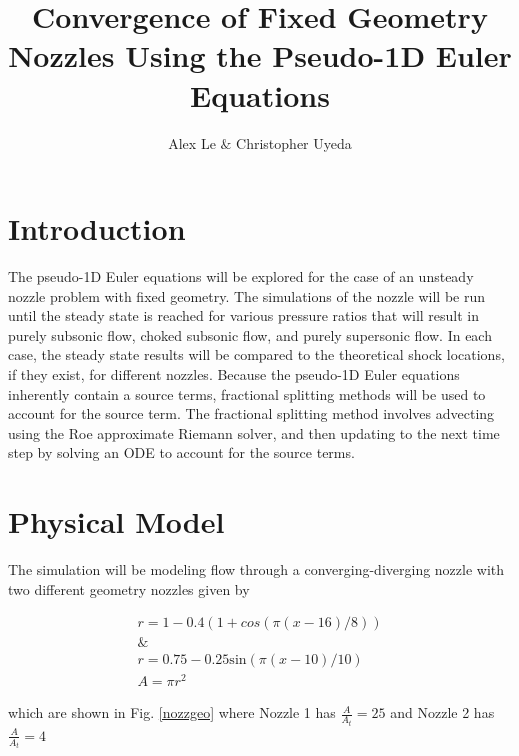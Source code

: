 \documentclass{article}%
\title{Convergence of Fixed Geometry Nozzles Using the Pseudo-1D Euler Equations}
\author{Alex Le $\&$ Christopher Uyeda}
\numberwithin{equation}{section}
\begin{document}
\maketitle

\section{Introduction}
The pseudo-1D Euler equations will be explored for the case of an unsteady nozzle problem with fixed geometry. The simulations of the nozzle will be run until the steady state is reached for various pressure ratios that will result in purely subsonic flow, choked subsonic flow, and purely supersonic flow. In each case, the steady state results will be compared to the theoretical shock locations, if they exist, for different nozzles. Because the pseudo-1D Euler equations inherently contain a source terms, fractional splitting methods will be used to account for the source term. The fractional splitting method involves advecting using the Roe approximate Riemann solver, and then updating to the next time step by solving an ODE to account for the source terms.


\section{Physical Model}
The simulation will be modeling flow through a converging-diverging nozzle with two different geometry nozzles given by

\begin{equation}
\begin{split}
r = 1-0.4(1 + cos(\pi(x -16)/8))   \\
\& \\
r = 0.75 - 0.25 \text{sin}(\pi(x - 10)/10)  \\
A = \pi r^2
\end{split}
\end{equation}

which are shown in Fig. \ref{nozzgeo} where Nozzle 1 has $\frac{A}{A_t} = 25$ and Nozzle 2 has $\frac{A}{A_t} = 4$
\end{document}
